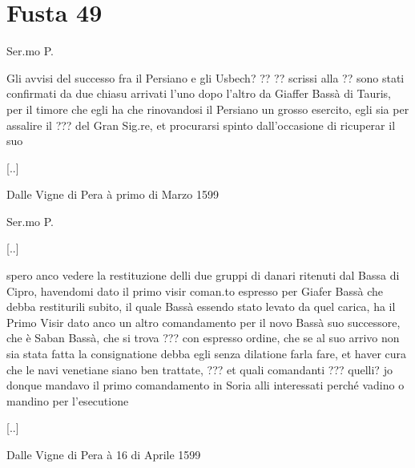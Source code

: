 \section{Fusta 49}

\setcounter{docnumber}{1}


\tuttocifrato

\begin{center}
Ser.mo P.
\end{center}

Gli avvisi  del successo fra il  Persiano e gli Usbech?  ?? ?? scrissi
alla  ?? sono  stati  confirmati  da due  chiasu  arrivati l'uno  dopo
l'altro da  Giaffer Bassà  di Tauris,  per il timore  che egli  ha che
rinovandosi il Persiano  un grosso esercito, egli sia  per assalire il
??? del Gran Sig.re,  et procurarsi spinto dall'occasione di ricuperar
il suo

[..]

Dalle Vigne di Pera à primo di Marzo 1599


\setcounter{docnumber}{8}


\tuttocifrato

\begin{center}
Ser.mo P.
\end{center}

[..]

spero anco vedere la restituzione  delli due gruppi di danari ritenuti
dal Bassa  di Cipro, havendomi  dato il primo visir  coman.to espresso
per Giafer Bassà che debba  restiturili subito, il quale Bassà essendo
stato levato  da quel  carica, ha  il Primo Visir  dato anco  un altro
comandamento per il novo Bassà  suo successore, che è Saban Bassà, che
si trova ???  con espresso ordine, che se al suo  arrivo non sia stata
fatta la consignatione debba egli senza dilatione farla fare, et haver
cura che le navi venetiane siano ben trattate, ??? et quali comandanti
???  quelli? jo  donque mandavo  il primo  comandamento in  Soria alli
interessati perché vadino o mandino per l'esecutione

[..]

\stopcifrato

Dalle Vigne di Pera à 16 di Aprile 1599

